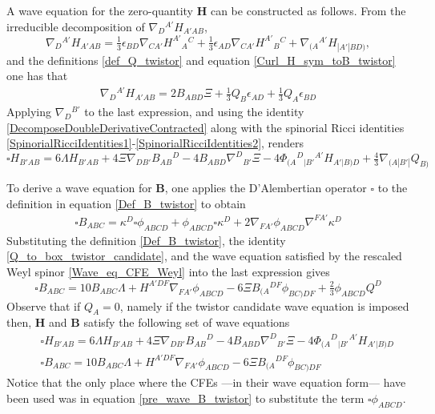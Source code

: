 \documentclass[10pt,a4paper]{article}
\theoremstyle{plain}
\def\bmB{{\bm B}}
\def\bmH{{\bm H}}
\begin{document}
{A wave equation for the zero-quantity $\bmH$ can be constructed as
follows.  From the irreducible decomposition of
$\nabla_D{}^{A'}H_{A'AB}$,
\[
\nabla_{D}{}^{A'}H_{A'AB} = \tfrac{1}{3} \epsilon _{BD}
\nabla_{CA'}H^{A'}{}_{A}{}^{C} + \tfrac{1}{3} \epsilon _{AD}
\nabla_{CA'}H^{A'}{}_{B}{}^{C} + \nabla_{(A}{}^{A'}H_{|A'|BD)},
\]
and the definitions \eqref{def_Q_twistor} and equation
\eqref{Curl_H_sym_toB_twistor} one has that
\begin{align}\label{derH_twistor_toBandQ}
\nabla_{D}{}^{A'}H_{A'AB} = 2 B_{ABD} \Xi + \tfrac{1}{3} Q_{B}
\epsilon _{AD} + \tfrac{1}{3} Q_{A} \epsilon _{BD}
\end{align}
Applying $\nabla_{D}{}^{B'}$ to the last expression, and using the
identity \eqref{DecomposeDoubleDerivativeContracted} along with the
spinorial Ricci identities
\eqref{SpinorialRicciIdentities1}-\eqref{SpinorialRicciIdentities2},
renders
\begin{equation}\label{wave_H_twistor}
  \square H_{B'AB} = 6 \Lambda H_{B'AB} + 4 \Xi
  \nabla_{DB'}B_{AB}{}^{D} -4 B_{ABD} \nabla^{D}{}_{B'}\Xi -4
  \Phi_{(A}{}^{D}{}_{|B'}{}^{A'}H_{A'|B)D} + \tfrac{4}{3}
  \nabla_{(A|B'|}Q_{B)}
\end{equation}

\noindent To derive a wave equation for $\bmB$, one applies the D'Alembertian operator
$\square$ to the definition in equation \eqref{Def_B_twistor} to obtain
\begin{align}\label{pre_wave_B_twistor}
\square B_{ABC} = \kappa ^{D} \square \phi _{ABCD} + \phi _{ABCD}
\square \kappa ^{D} + 2 \nabla_{FA'}\phi _{ABCD} \nabla^{FA'}\kappa
^{D}
\end{align}
Substituting the definition \eqref{Def_B_twistor}, the identity
\eqref{Q_to_box_twistor_candidate}, and the wave equation satisfied by
the rescaled Weyl spinor \eqref{Wave_eq_CFE_Weyl} into the last expression gives
\begin{equation}\label{wave_B_twistor}
\square B_{ABC} = 10 B_{ABC} \Lambda + H^{A'DF} \nabla_{FA'}\phi _{ABCD}  -6 \Xi B_{(A}{}^{DF}\phi
_{BC)DF} + \tfrac{2}{3} \phi _{ABCD} Q^{D}
\end{equation}
Observe that if $Q_{A}=0$, namely if the twistor candidate wave equation is imposed then,
$\bmH$ and $\bmB$ satisfy the following set of wave equations
\begin{subequations}
\begin{eqnarray}
  && \square H_{B'AB} = 6 \Lambda H_{B'AB} + 4 \Xi
  \nabla_{DB'}B_{AB}{}^{D}  -4 B_{ABD} \nabla^{D}{}_{B'}\Xi   -4 \Phi_{(A}{}^{D}{}_{|B'}{}^{A'}H_{A'|B)D}
   \label{Hom_wave_HandB1} \\
 && \square B_{ABC} = 10 B_{ABC} \Lambda + H^{A'DF} \nabla_{FA'}\phi _{ABCD}  -6 \Xi B_{(A}{}^{DF}\phi
_{BC)DF}  \label{Hom_wave_HandB2}
\end{eqnarray}
\end{subequations}
Notice that the only place where the CFEs ---in their wave equation form---
have been used was in equation \eqref{pre_wave_B_twistor}
to substitute the term $\square \phi _{ABCD}$.

}
\end{document}
